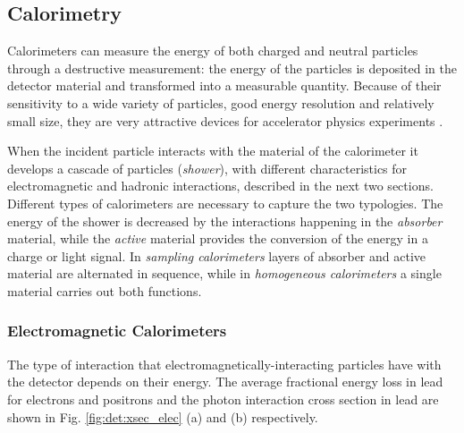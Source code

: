 \subsection{Calorimetry}
\label{sec:dec:calo}

Calorimeters can measure the energy of both charged and neutral particles through a destructive measurement: the energy of the particles is deposited in the detector material and transformed into a measurable quantity. Because of their sensitivity to a wide variety of particles, good energy resolution and relatively small size, they are very attractive devices for accelerator physics experiments \cite{RevModPhys.75.1243} \cite{Wigmans:2000vf}.

When the incident particle interacts with the material of the calorimeter it develops a cascade of particles (\textit{shower}), with different characteristics for electromagnetic and hadronic interactions, described in the next two sections. Different types of calorimeters are necessary to capture the two typologies. The energy of the shower is decreased by the interactions happening in the \textit{absorber} material, while the \textit{active} material provides the conversion of the energy in a charge or light signal. In \textit{sampling calorimeters} layers of absorber and active material are alternated in sequence, while in \textit{homogeneous calorimeters} a single material carries out both functions.


\subsubsection*{Electromagnetic Calorimeters}

The type of interaction that electromagnetically-interacting particles have with the detector depends on their energy. The average fractional energy loss in lead for electrons and positrons and the photon interaction cross section in lead are shown in Fig. \ref{fig:det:xsec_elec} (a) and (b) respectively. 

